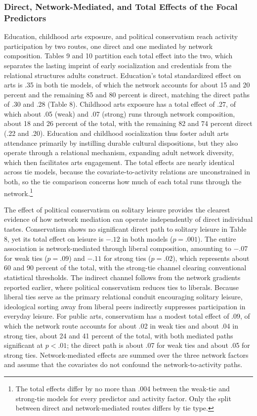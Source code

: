 \documentclass[
  12pt
]{article}
\begin{document}
\subsubsection{Direct, Network-Mediated, and Total Effects of the Focal Predictors}\label{direct-network-mediated-and-total-effects-of-the-focal-predictors}

Education, childhood arts exposure, and political conservatism reach activity participation by two routes, one direct and one mediated by network composition. Tables 9 and 10 partition each total effect into the two, which separates the lasting imprint of early socialization and credentials from the relational structures adults construct. Education's total standardized effect on arts is .35 in both tie models, of which the network accounts for about 15 and 20 percent and the remaining 85 and 80 percent is direct, matching the direct paths of .30 and .28 (Table 8). Childhood arts exposure has a total effect of .27, of which about .05 (weak) and .07 (strong) runs through network composition, about 18 and 26 percent of the total, with the remaining 82 and 74 percent direct (.22 and .20). Education and childhood socialization thus foster adult arts attendance primarily by instilling durable cultural dispositions, but they also operate through a relational mechanism, expanding adult network diversity, which then facilitates arts engagement. The total effects are nearly identical across tie models, because the covariate-to-activity relations are unconstrained in both, so the tie comparison concerns how much of each total runs through the network.\footnote{The total effects differ by no more than .004 between the weak-tie and strong-tie models for every predictor and activity factor. Only the split between direct and network-mediated routes differs by tie type.}

The effect of political conservatism on solitary leisure provides the clearest evidence of how network mediation can operate independently of direct individual tastes. Conservatism shows no significant direct path to solitary leisure in Table 8, yet its total effect on leisure is $-.12$ in both models ($p = .001$). The entire association is network-mediated through liberal composition, amounting to $-.07$ for weak ties ($p = .09$) and $-.11$ for strong ties ($p = .02$), which represents about 60 and 90 percent of the total, with the strong-tie channel clearing conventional statistical thresholds. The indirect channel follows from the network gradients reported earlier, where political conservatism reduces ties to liberals. Because liberal ties serve as the primary relational conduit encouraging solitary leisure, ideological sorting away from liberal peers indirectly suppresses participation in everyday leisure. For public arts, conservatism has a modest total effect of .09, of which the network route accounts for about .02 in weak ties and about .04 in strong ties, about 24 and 41 percent of the total, with both mediated paths significant at $p < .01$; the direct path is about .07 for weak ties and about .05 for strong ties. Network-mediated effects are summed over the three network factors and assume that the covariates do not confound the network-to-activity paths.
\end{document}
